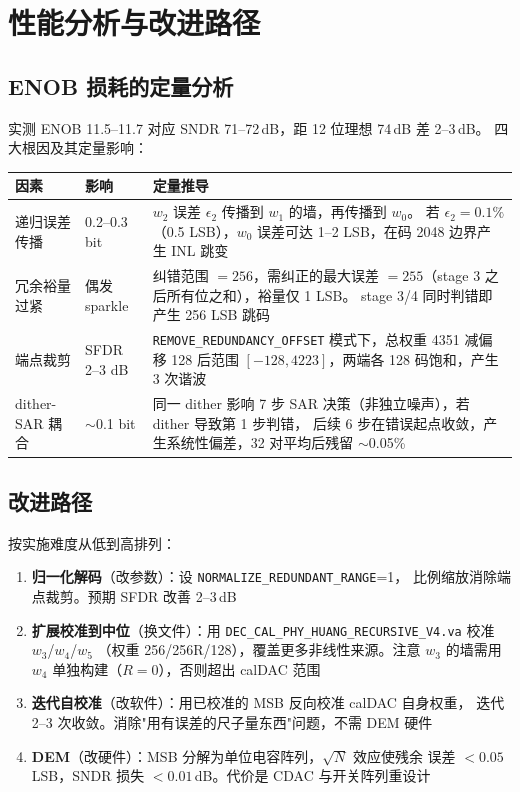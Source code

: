 \documentclass[UTF8,a4paper,11pt,twoside]{ctexrep}
\begin{document}
\chapter{性能分析与改进路径}

\section{ENOB 损耗的定量分析}

实测 ENOB 11.5--11.7 对应 SNDR 71--72\,dB，距 12 位理想 74\,dB 差 2--3\,dB。
四大根因及其定量影响：

\begin{table}[ht]\centering\footnotesize
\begin{tabular}{p{3.2cm}p{1.8cm}p{6.8cm}}
\toprule
\textbf{因素} & \textbf{影响} & \textbf{定量推导} \\
\hline
递归误差传播 & 0.2--0.3 bit &
$w_2$ 误差 $\epsilon_2$ 传播到 $w_1$ 的墙，再传播到 $w_0$。
若 $\epsilon_2=0.1\%$（0.5 LSB），$w_0$ 误差可达 1--2 LSB，在码 2048 边界产生 INL 跳变 \\
冗余裕量过紧 & 偶发 sparkle &
纠错范围 $=256$，需纠正的最大误差 $=255$（stage 3 之后所有位之和），裕量仅 1 LSB。
stage 3/4 同时判错即产生 256 LSB 跳码 \\
端点裁剪 & SFDR 2--3 dB &
\texttt{REMOVE\_REDUNDANCY\_OFFSET} 模式下，总权重 4351 减偏移 128 后范围
$[-128, 4223]$，两端各 128 码饱和，产生 3 次谐波 \\
dither-SAR 耦合 & $\sim$0.1 bit &
同一 dither 影响 7 步 SAR 决策（非独立噪声），若 dither 导致第 1 步判错，
后续 6 步在错误起点收敛，产生系统性偏差，32 对平均后残留 $\sim$0.05\% \\
\bottomrule
\end{tabular}
\end{table}

\section{改进路径}

按实施难度从低到高排列：

\begin{enumerate}
\item \textbf{归一化解码}（改参数）：设 \texttt{NORMALIZE\_REDUNDANT\_RANGE}=1，
      比例缩放消除端点裁剪。预期 SFDR 改善 2--3\,dB

\item \textbf{扩展校准到中位}（换文件）：用
      \texttt{DEC\_CAL\_PHY\_HUANG\_RECURSIVE\_V4.va} 校准 $w_3$/$w_4$/$w_5$
      （权重 256/256R/128），覆盖更多非线性来源。注意 $w_3$ 的墙需用 $w_4$
      单独构建（$R=0$），否则超出 calDAC 范围

\item \textbf{迭代自校准}（改软件）：用已校准的 MSB 反向校准 calDAC 自身权重，
      迭代 2--3 次收敛。消除"用有误差的尺子量东西"问题，不需 DEM 硬件

\item \textbf{DEM}（改硬件）：MSB 分解为单位电容阵列，$\sqrt{N}$ 效应使残余
      误差 $<0.05$ LSB，SNDR 损失 $<0.01$\,dB。代价是 CDAC 与开关阵列重设计
\end{enumerate}
\end{document}
